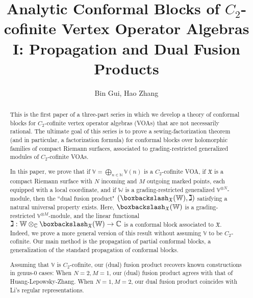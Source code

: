 \documentclass[11pt,b5paper,notitlepage]{article}
\title{Analytic Conformal Blocks of $C_2$-cofinite Vertex Operator Algebras I: Propagation and Dual Fusion Products}
\author{{\sc Bin Gui, Hao Zhang}
}
\date{}
\theoremstyle{definition}
\theoremstyle{plain}
\newcommand{\Vbb}{\mathbb V}
\newcommand{\Wbb}{\mathbb W}
\newcommand{\Cbb}{\mathbb C}
\newcommand{\Nbb}{\mathbb N}
\newcommand{\<}{\left\langle}
\renewcommand{\>}{\right\rangle}
\newcommand{\fx}{\mathfrak{X}}
\newcommand{\bbs}{\boxbackslash}
\numberwithin{equation}{section}
\begin{document}
\sloppy %
	\setcounter{section}{-1}
	
	
	
	\maketitle
	
	
\newcommand\blfootnote[1]{%
	\begingroup
	\renewcommand\thefootnote{}\footnote{#1}%
	\addtocounter{footnote}{-1}%
	\endgroup
}



\begin{abstract}
This is the first paper of a three-part series in which we develop a theory of conformal blocks for $C_2$-cofinite vertex operator algebras (VOAs) that are not necessarily rational. The ultimate goal of this series is to prove a sewing-factorization theorem (and in particular, a factorization formula) for conformal blocks over holomorphic families of compact Riemann surfaces, associated to grading-restricted generalized modules of $C_2$-cofinite VOAs.

In this paper, we prove that if $\Vbb=\bigoplus_{n\in\Nbb}\Vbb(n)$ is a $C_2$-cofinite VOA, if $\fx$ is a compact Riemann surface with $N$ incoming and $M$ outgoing marked points, each  equipped with a local coordinate, and if $\Wbb$ is a grading-restricted generalized $\Vbb^{\otimes N}$-module, then the ``dual fusion product" $(\bbs_\fx(\Wbb),\gimel)$ satisfying a natural universal property exists. Here, $\bbs_\fx(\Wbb)$ is a grading-restricted $\Vbb^{\otimes M}$-module, and the linear functional $\gimel:\Wbb\otimes_\Cbb\bbs_\fx(\Wbb)\rightarrow\Cbb$ is a conformal block associated to $\fx$. Indeed, we prove a more general version of this result without assuming $\Vbb$ to be $C_2$-cofinite. Our main method is the propagation of partial conformal blocks, a generalization of the standard propagation of conformal blocks.

Assuming that $\Vbb$ is $C_2$-cofinite, our (dual) fusion product recovers known constructions in genus-0 cases: When $N=2,M=1$, our (dual) fusion product agrees with that of Huang-Lepowsky-Zhang. When $N=1,M=2$, our dual fusion product coincides with Li's regular representations.
\end{abstract}
\end{document}
